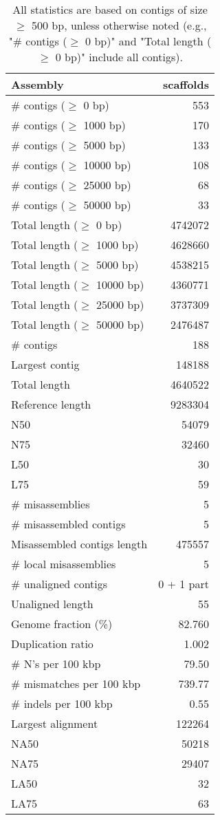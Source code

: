 \documentclass[12pt,a4paper]{article}
\begin{document}
\begin{table}[ht]
\begin{center}
\caption{All statistics are based on contigs of size $\geq$ 500 bp, unless otherwise noted (e.g., "\# contigs ($\geq$ 0 bp)" and "Total length ($\geq$ 0 bp)" include all contigs).}
\begin{tabular}{|l*{1}{|r}|}
\hline
Assembly & scaffolds \\ \hline
\# contigs ($\geq$ 0 bp) & 553 \\ \hline
\# contigs ($\geq$ 1000 bp) & 170 \\ \hline
\# contigs ($\geq$ 5000 bp) & 133 \\ \hline
\# contigs ($\geq$ 10000 bp) & 108 \\ \hline
\# contigs ($\geq$ 25000 bp) & 68 \\ \hline
\# contigs ($\geq$ 50000 bp) & 33 \\ \hline
Total length ($\geq$ 0 bp) & 4742072 \\ \hline
Total length ($\geq$ 1000 bp) & 4628660 \\ \hline
Total length ($\geq$ 5000 bp) & 4538215 \\ \hline
Total length ($\geq$ 10000 bp) & 4360771 \\ \hline
Total length ($\geq$ 25000 bp) & 3737309 \\ \hline
Total length ($\geq$ 50000 bp) & 2476487 \\ \hline
\# contigs & 188 \\ \hline
Largest contig & 148188 \\ \hline
Total length & 4640522 \\ \hline
Reference length & 9283304 \\ \hline
N50 & 54079 \\ \hline
N75 & 32460 \\ \hline
L50 & 30 \\ \hline
L75 & 59 \\ \hline
\# misassemblies & 5 \\ \hline
\# misassembled contigs & 5 \\ \hline
Misassembled contigs length & 475557 \\ \hline
\# local misassemblies & 5 \\ \hline
\# unaligned contigs & 0 + 1 part \\ \hline
Unaligned length & 55 \\ \hline
Genome fraction (\%) & 82.760 \\ \hline
Duplication ratio & 1.002 \\ \hline
\# N's per 100 kbp & 79.50 \\ \hline
\# mismatches per 100 kbp & 739.77 \\ \hline
\# indels per 100 kbp & 0.55 \\ \hline
Largest alignment & 122264 \\ \hline
NA50 & 50218 \\ \hline
NA75 & 29407 \\ \hline
LA50 & 32 \\ \hline
LA75 & 63 \\ \hline
\end{tabular}
\end{center}
\end{table}
\end{document}
